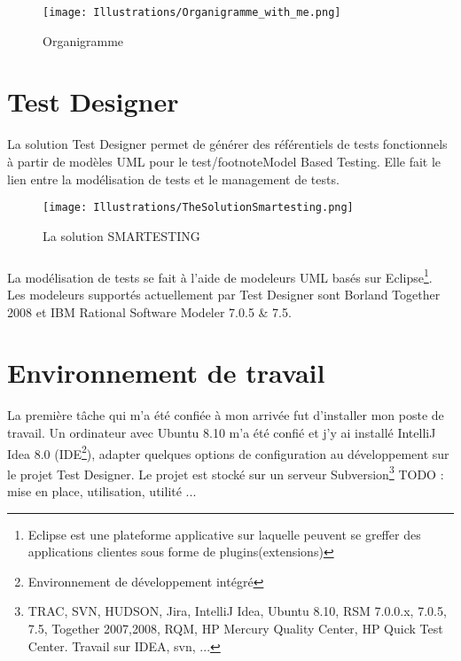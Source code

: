 \begin{figure}[!h]
\centering
\texttt{[image: Illustrations/Organigramme\_with\_me.png]}
\caption{Organigramme}
\label{fig:Organigramme de Smartesting}
\end{figure}

\section{Test Designer}
La solution Test Designer permet de générer des référentiels de tests fonctionnels à partir de modèles UML pour le test/footnote{Model Based Testing}. Elle fait le lien entre la modélisation de tests et le management de tests.

\begin{figure}[!h]
\centering
\texttt{[image: Illustrations/TheSolutionSmartesting.png]}
\caption{La solution SMARTESTING}
\label{fig: La Solution SMARTESTING}
\end{figure}



\subparagraph*{}
La modélisation de tests se fait à l'aide de modeleurs UML basés sur Eclipse\footnote{Eclipse est une plateforme applicative sur laquelle peuvent se greffer des applications clientes sous forme de plugins(extensions)}. Les modeleurs supportés actuellement par Test Designer sont Borland Together 2008 et IBM Rational Software Modeler 7.0.5 \& 7.5. 




\section{Environnement de travail}
La première tâche qui m'a été confiée à mon arrivée fut d'installer mon poste de travail. Un ordinateur avec Ubuntu 8.10 m'a été confié et j'y ai installé IntelliJ Idea 8.0 (IDE\footnote{Environnement de développement intégré}), adapter quelques options de configuration au développement sur le projet Test Designer. Le projet est stocké sur un serveur Subversion\footnote{
TRAC, SVN, HUDSON, Jira, IntelliJ Idea, Ubuntu 8.10, RSM 7.0.0.x, 7.0.5, 7.5, Together 2007,2008, RQM, HP Mercury Quality Center, HP Quick Test Center.
Travail sur IDEA, svn, ...}
TODO : mise en place, utilisation, utilité ...



